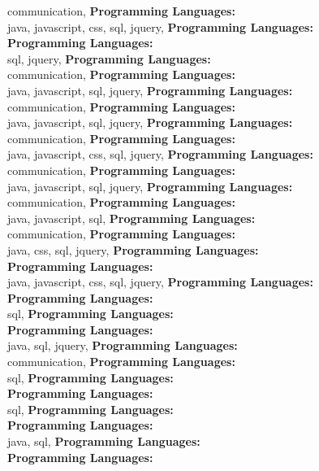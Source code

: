 communication, \textbf{Programming Languages:} \\
java, javascript, css, sql, jquery, \textbf{Programming Languages:} \\
\textbf{Programming Languages:} \\
sql, jquery, \textbf{Programming Languages:} \\
communication, \textbf{Programming Languages:} \\
java, javascript, sql, jquery, \textbf{Programming Languages:} \\
communication, \textbf{Programming Languages:} \\
java, javascript, sql, jquery, \textbf{Programming Languages:} \\
communication, \textbf{Programming Languages:} \\
java, javascript, css, sql, jquery, \textbf{Programming Languages:} \\
communication, \textbf{Programming Languages:} \\
java, javascript, sql, jquery, \textbf{Programming Languages:} \\
communication, \textbf{Programming Languages:} \\
java, javascript, sql, \textbf{Programming Languages:} \\
communication, \textbf{Programming Languages:} \\
java, css, sql, jquery, \textbf{Programming Languages:} \\
\textbf{Programming Languages:} \\
java, javascript, css, sql, jquery, \textbf{Programming Languages:} \\
\textbf{Programming Languages:} \\
sql, \textbf{Programming Languages:} \\
\textbf{Programming Languages:} \\
java, sql, jquery, \textbf{Programming Languages:} \\
communication, \textbf{Programming Languages:} \\
sql, \textbf{Programming Languages:} \\
\textbf{Programming Languages:} \\
sql, \textbf{Programming Languages:} \\
\textbf{Programming Languages:} \\
java, sql, \textbf{Programming Languages:} \\
\textbf{Programming Languages:} \\
